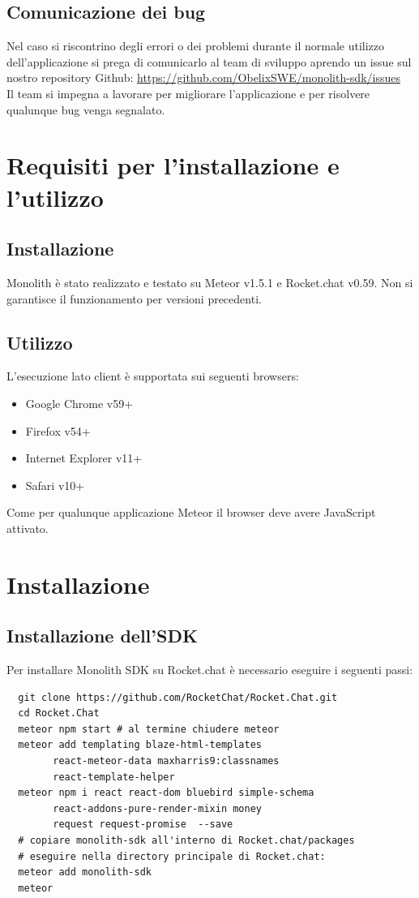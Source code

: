 \subsection{Comunicazione dei bug}
Nel caso si riscontrino degli errori o dei problemi durante il normale utilizzo dell'applicazione si prega di comunicarlo al team di sviluppo aprendo un issue sul nostro repository Github:
\url{https://github.com/ObelixSWE/monolith-sdk/issues} \\
Il team si impegna a lavorare per migliorare l'applicazione e per risolvere qualunque bug venga segnalato.

\section{Requisiti per l'installazione e l'utilizzo}
\subsection{Installazione}
Monolith è stato realizzato e testato su Meteor v1.5.1 e Rocket.chat v0.59. Non si garantisce il funzionamento per versioni precedenti.
\subsection{Utilizzo}
L'esecuzione lato client è supportata sui seguenti browsers:
\begin{itemize}
	\item Google Chrome v59+
	\item Firefox v54+
	\item Internet Explorer v11+
	\item Safari v10+
\end{itemize}
Come per qualunque applicazione Meteor il browser deve avere JavaScript attivato.

\section{Installazione}
\subsection{Installazione dell'SDK}
Per installare Monolith SDK su Rocket.chat è necessario eseguire i seguenti passi:
\begin{lstlisting}
  git clone https://github.com/RocketChat/Rocket.Chat.git
  cd Rocket.Chat
  meteor npm start # al termine chiudere meteor
  meteor add templating blaze-html-templates 
		react-meteor-data maxharris9:classnames
		react-template-helper	
  meteor npm i react react-dom bluebird simple-schema 
  		react-addons-pure-render-mixin money 
  		request request-promise  --save
  # copiare monolith-sdk all'interno di Rocket.chat/packages
  # eseguire nella directory principale di Rocket.chat:
  meteor add monolith-sdk
  meteor
\end{lstlisting}

